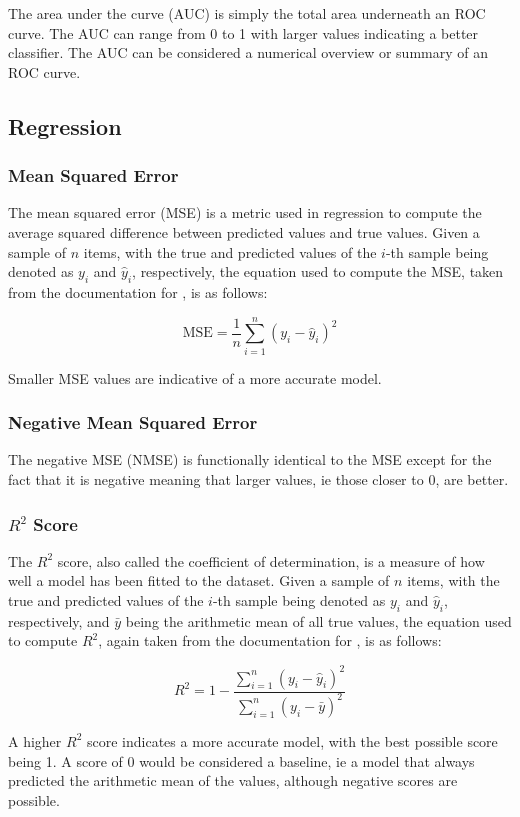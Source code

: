 The area under the curve (AUC) is simply the total area underneath an ROC curve. The AUC can range from 0 to 1 with larger values indicating a better classifier. The AUC can be considered a numerical overview or summary of an ROC curve.

\subsection{Regression}

\subsubsection{Mean Squared Error}

The mean squared error (MSE) is a metric used in regression to compute the average squared difference between predicted values and true values. Given a sample of $n$ items, with the true and predicted values of the $i$-th sample being denoted as $y_i$ and $\hat{y}_i$, respectively, the equation used to compute the MSE, taken from the documentation for \cite{pedregosa2011scikit}, is as follows:

\begin{equation*}
    \mathrm{MSE} = \frac{1}{n} \sum_{i=1}^n (y_i - \hat{y}_i)^2
\end{equation*}

Smaller MSE values are indicative of a more accurate model.

\subsubsection{Negative Mean Squared Error}

The negative MSE (NMSE) is functionally identical to the MSE except for the fact that it is negative meaning that larger values, ie those closer to 0, are better.

\subsubsection{$R^2$ Score}

The $R^2$ score, also called the coefficient of determination, is a measure of how well a model has been fitted to the dataset. Given a sample of $n$ items, with the true and predicted values of the $i$-th sample being denoted as $y_i$ and $\hat{y}_i$, respectively, and $\bar{y}$ being the arithmetic mean of all true values, the equation used to compute $R^2$, again taken from the documentation for \cite{pedregosa2011scikit}, is as follows:

\begin{equation*}
    R^2 = 1 - \frac{\sum_{i=1}^n (y_i - \hat{y}_i)^2}{\sum_{i=1}^n (y_i - \bar{y})^2}
\end{equation*}

A higher $R^2$ score indicates a more accurate model, with the best possible score being 1. A score of 0 would be considered a baseline, ie a model that always predicted the arithmetic mean of the values, although negative scores are possible.
